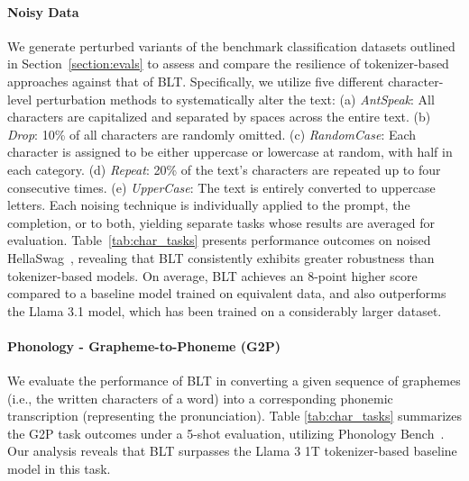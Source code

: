 \paragraph{Noisy Data} We generate perturbed variants of the benchmark classification datasets outlined in Section~\ref{section:evals} to assess and compare the resilience of tokenizer-based approaches against that of {\textsc BLT}. Specifically, we utilize five different character-level perturbation methods to systematically alter the text: (a) \textit{AntSpeak}: All characters are capitalized and separated by spaces across the entire text. (b) \textit{Drop}: 10\% of all characters are randomly omitted. (c) \textit{RandomCase}: Each character is assigned to be either uppercase or lowercase at random, with half in each category. (d) \textit{Repeat}: 20\% of the text’s characters are repeated up to four consecutive times. (e) \textit{UpperCase}: The text is entirely converted to uppercase letters. Each noising technique is individually applied to the prompt, the completion, or to both, yielding separate tasks whose results are averaged for evaluation. Table~\ref{tab:char_tasks} presents performance outcomes on noised HellaSwag~\citep{Eval_hellaswag}, revealing that {\textsc BLT} consistently exhibits greater robustness than tokenizer-based models. On average, {\textsc BLT} achieves an 8-point higher score compared to a baseline model trained on equivalent data, and also outperforms the Llama 3.1 model, which has been trained on a considerably larger dataset.

\paragraph{Phonology - Grapheme-to-Phoneme (G2P)} We evaluate the performance of {\textsc BLT} in converting a given sequence of graphemes (i.e., the written characters of a word) into a corresponding phonemic transcription (representing the pronunciation). Table \ref{tab:char_tasks} summarizes the G2P task outcomes under a 5-shot evaluation, utilizing Phonology Bench~\citep{suvarna2024phonologybench}. Our analysis reveals that {\textsc BLT} surpasses the Llama 3 1T tokenizer-based baseline model in this task.

